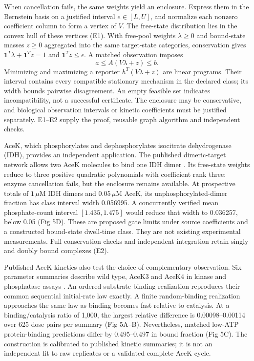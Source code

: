 \documentclass[10pt,letterpaper]{article}
\begin{document}
When cancellation fails, the same weights yield an enclosure. Express them in the Bernstein basis on a justified interval $e\in[L,U]$, and normalize each nonzero coefficient column to form a vertex of $V$. The free-state distribution lies in the convex hull of these vertices (E1). With free-pool weights $\lambda\geq0$ and bound-state masses $z\geq0$ aggregated into the same target-state categories, conservation gives $\mathbf1^T\lambda+\mathbf1^Tz=1$ and $\mathbf1^Tz\leq\epsilon$. A matched observation imposes
\begin{equation}
 a\leq A(V\lambda+z)\leq b.
\end{equation}
Minimizing and maximizing a reporter $h^T(V\lambda+z)$ are linear programs. Their interval contains every compatible stationary mechanism in the declared class; its width bounds pairwise disagreement. An empty feasible set indicates incompatibility, not a successful certificate. The enclosure may be conservative, and biological observation intervals or kinetic coefficients must be justified separately. E1--E2 supply the proof, reusable graph algorithm and independent checks.

AceK, which phosphorylates and dephosphorylates isocitrate dehydrogenase (IDH), provides an independent application. The published dimeric-target network allows two AceK molecules to bind one IDH dimer \cite{r84}. Its free-state weights reduce to three positive quadratic polynomials with coefficient rank three: enzyme cancellation fails, but the enclosure remains available. At prospective totals of $1\,\mu$M IDH dimers and $0.05\,\mu$M AceK, its unphosphorylated-dimer fraction has class interval width 0.056995. A concurrently verified mean phosphate-count interval $[1.435,1.475]$ would reduce that width to 0.036257, below 0.05 (Fig 5D). These are proposed gate limits under source coefficients and a constructed bound-state dwell-time class. They are not existing experimental measurements. Full conservation checks and independent integration retain singly and doubly bound complexes (E2).

Published AceK kinetics also test the choice of complementary observation. Six parameter summaries describe wild type, AceK3 and AceK4 in kinase and phosphatase assays \cite{r83}. An ordered substrate-binding realization reproduces their common sequential initial-rate law exactly. A finite random-binding realization approaches the same law as binding becomes fast relative to catalysis. At a binding/catalysis ratio of 1,000, the largest relative difference is 0.00098--0.00114 over 625 dose pairs per summary (Fig 5A--B). Nevertheless, matched low-ATP protein-binding predictions differ by 0.495--0.497 in bound fraction (Fig 5C). The construction is calibrated to published kinetic summaries; it is not an independent fit to raw replicates or a validated complete AceK cycle.
\end{document}
